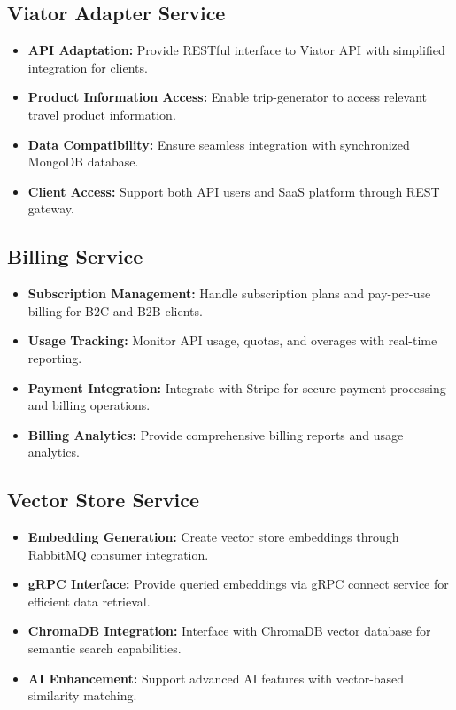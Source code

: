 \subsection{Viator Adapter Service}
\begin{itemize}
    \item \textbf{API Adaptation:} Provide RESTful interface to Viator API with simplified integration for clients.
    \item \textbf{Product Information Access:} Enable trip-generator to access relevant travel product information.
    \item \textbf{Data Compatibility:} Ensure seamless integration with synchronized MongoDB database.
    \item \textbf{Client Access:} Support both API users and SaaS platform through REST gateway.
\end{itemize}

\subsection{Billing Service}
\begin{itemize}
    \item \textbf{Subscription Management:} Handle subscription plans and pay-per-use billing for B2C and B2B clients.
    \item \textbf{Usage Tracking:} Monitor API usage, quotas, and overages with real-time reporting.
    \item \textbf{Payment Integration:} Integrate with Stripe for secure payment processing and billing operations.
    \item \textbf{Billing Analytics:} Provide comprehensive billing reports and usage analytics.
\end{itemize}

\subsection{Vector Store Service}
\begin{itemize}
    \item \textbf{Embedding Generation:} Create vector store embeddings through RabbitMQ consumer integration.
    \item \textbf{gRPC Interface:} Provide queried embeddings via gRPC connect service for efficient data retrieval.
    \item \textbf{ChromaDB Integration:} Interface with ChromaDB vector database for semantic search capabilities.
    \item \textbf{AI Enhancement:} Support advanced AI features with vector-based similarity matching.
\end{itemize}

